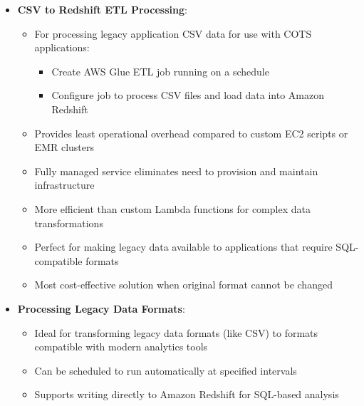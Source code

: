 \documentclass[11pt,a4paper]{report}
\begin{document}
\begin{itemize}
\begin{itemize}
  \item Better approach than modifying worker count (NumberOfWorkers=1)
  \item Not related to FindMatches ML transform (which is for identifying duplicate records)
  \item Prevents reprocessing of old data in ETL jobs that run regularly
  \item Tracks data that has already been processed in previous runs
  \item Enables processing of only new or changed data since the last execution
  \item Optimizes ETL processes by saving on processing time and resources
  \item More efficient than deleting processed data or modifying worker count
\end{itemize}
  \item \textbf{CSV to Redshift ETL Processing}:
\begin{itemize}
  \item For processing legacy application CSV data for use with COTS applications:
\begin{itemize}
  \item Create AWS Glue ETL job running on a schedule
  \item Configure job to process CSV files and load data into Amazon Redshift
\end{itemize}
  \item Provides least operational overhead compared to custom EC2 scripts or EMR clusters
  \item Fully managed service eliminates need to provision and maintain infrastructure
  \item More efficient than custom Lambda functions for complex data transformations
  \item Perfect for making legacy data available to applications that require SQL-compatible formats
  \item Most cost-effective solution when original format cannot be changed
\end{itemize}
  \item \textbf{Processing Legacy Data Formats}:
\begin{itemize}
  \item Ideal for transforming legacy data formats (like CSV) to formats compatible with modern analytics tools
  \item Can be scheduled to run automatically at specified intervals
  \item Supports writing directly to Amazon Redshift for SQL-based analysis

\end{itemize}
\end{itemize}
\end{document}
